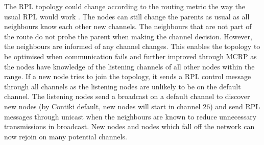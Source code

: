 
The RPL topology could change according to the routing metric \cite{routingmetrics} the way the usual RPL would work \cite{winter2012rpl}. The nodes can still change the parents as usual as all neighbours know each other new channels. The neighbours that are not part of the route do not probe the parent when making the channel decision. However, the neighbours are informed of any channel changes.
This enables the topology to be optimised when communication fails and further improved through MCRP as the nodes have knowledge of the listening channels of all other nodes within the range. If a new node tries to join the topology, it sends a RPL control message through all channels as the listening nodes are unlikely to be on the default channel. The listening nodes send a broadcast on a default channel to discover new nodes (by Contiki default, new nodes will start in channel 26) and send RPL messages through unicast when the neighbours are known to reduce unnecessary transmissions in broadcast. New nodes and nodes which fall off the network can now rejoin on many potential channels.

